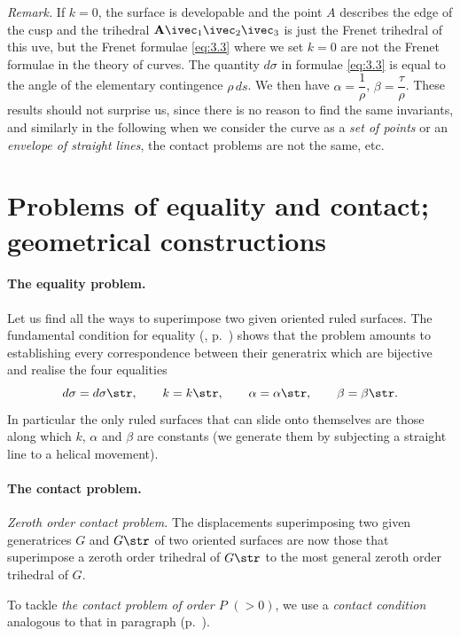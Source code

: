 \somespace

\emph{Remark.} If $k=0$, the surface is developable and the point $A$ describes the edge of the cusp and the trihedral $\mathbf{A}\ivec_{1}\ivec_{2}\ivec_{3}$ is just the Frenet trihedral of this uve, but the Frenet formulae \eqref{eq:3.3} where we set $k=0$ are not the Frenet formulae in the theory of curves. The quantity $d\sigma$ in formulae \eqref{eq:3.3} is equal to the angle of the elementary contingence $\rho\,ds$. We then have $\alpha=\dfrac{1}{\rho}$, $\beta=\dfrac{\tau}{\rho}$. These results should not surprise us, since there is no reason to find the same invariants, and similarly in the following when we consider the curve as a \emph{set of points} or an \emph{envelope of straight lines}, the contact problems are not the same, etc.

\section[{Problems of equality and contact; geometrical constructions}]{Problems of equality and contact;\\geometrical constructions}
\label{sec:probl-equal-cont-1}

\paragraph{The equality problem.}
\label{sec:46}
Let us find all the ways to superimpose two given oriented ruled surfaces. The fundamental condition for equality (, p.~\pageref{sec:7}) shows that the problem amounts to establishing every correspondence between their generatrix which are bijective and realise the four equalities
\[
d\sigma=d\sigma\str,\qquad k=k\str,\qquad \alpha=\alpha\str,\qquad\beta=\beta\str.
\]
In particular the only ruled surfaces that can slide onto themselves are those along which $k$, $\alpha$ and $\beta$ are constants (we generate them by subjecting a straight line to a helical movement).

\paragraph{The contact problem.}
\label{sec:47}
\emph{Zeroth order contact problem.} The displacements superimposing two given generatrices $G$ and $G\str$ of two oriented surfaces are now those that superimpose a zeroth order trihedral of $G\str$ to the most general zeroth order trihedral of $G$.

To tackle \emph{the contact problem of order $P$} $(>0)$, we use a \emph{contact condition} analogous to that in paragraph  (p.~\pageref{sec:16}).

